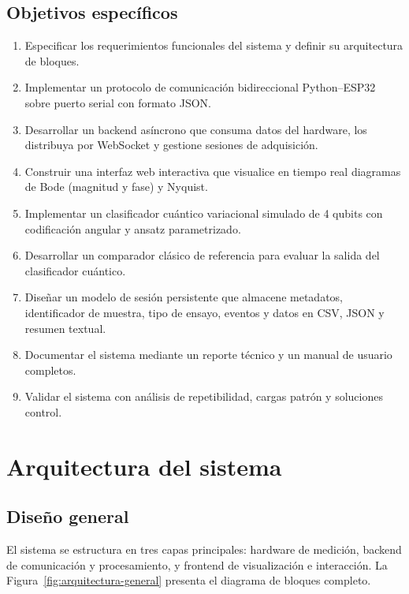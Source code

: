 \documentclass[11pt,a4paper,spanish]{book}
\begin{document}
\section{Objetivos espec\'{i}ficos}

\begin{enumerate}
	\item Especificar los requerimientos funcionales del sistema y definir su arquitectura de bloques.
	\item Implementar un protocolo de comunicaci\'{o}n bidireccional Python--ESP32 sobre puerto serial con formato JSON.
	\item Desarrollar un backend as\'{i}ncrono que consuma datos del hardware, los distribuya por WebSocket y gestione sesiones de adquisici\'{o}n.
	\item Construir una interfaz web interactiva que visualice en tiempo real diagramas de Bode (magnitud y fase) y Nyquist.
	\item Implementar un clasificador cu\'{a}ntico variacional simulado de 4 qubits con codificaci\'{o}n angular y ansatz parametrizado.
	\item Desarrollar un comparador cl\'{a}sico de referencia para evaluar la salida del clasificador cu\'{a}ntico.
	\item Dise\~{n}ar un modelo de sesi\'{o}n persistente que almacene metadatos, identificador de muestra, tipo de ensayo, eventos y datos en CSV, JSON y resumen textual.
	\item Documentar el sistema mediante un reporte t\'{e}cnico y un manual de usuario completos.
	\item Validar el sistema con an\'{a}lisis de repetibilidad, cargas patr\'{o}n y soluciones control.
\end{enumerate}

\chapter{Arquitectura del sistema}

\section{Dise\~{n}o general}

El sistema se estructura en tres capas principales: hardware de medici\'{o}n, backend de comunicaci\'{o}n y procesamiento, y frontend de visualizaci\'{o}n e interacci\'{o}n. La Figura~\ref{fig:arquitectura-general} presenta el diagrama de bloques completo.
\end{document}
